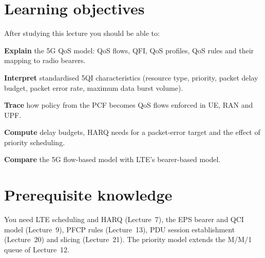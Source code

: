 \documentclass[11pt,a4paper]{article}
\begin{document}
\ACNcover

\section{Learning objectives}
After studying this lecture you should be able to:
\begin{objectives}
  \item \textbf{Explain} the 5G QoS model: QoS flows, QFI, QoS profiles, QoS rules and their mapping to radio bearers.
  \item \textbf{Interpret} standardised 5QI characteristics (resource type, priority, packet delay budget, packet error rate,
        maximum data burst volume).
  \item \textbf{Trace} how policy from the PCF becomes QoS flows enforced in UE, RAN and UPF.
  \item \textbf{Compute} delay budgets, HARQ needs for a packet-error target and the effect of priority scheduling.
  \item \textbf{Compare} the 5G flow-based model with LTE's bearer-based model.
\end{objectives}

\section{Prerequisite knowledge}
You need LTE scheduling and HARQ (Lecture~7), the EPS bearer and QCI model (Lecture~9), PFCP rules (Lecture~13), PDU session
establishment (Lecture~20) and slicing (Lecture~21). The priority model extends the M/M/1 queue of Lecture~12.
\end{document}

